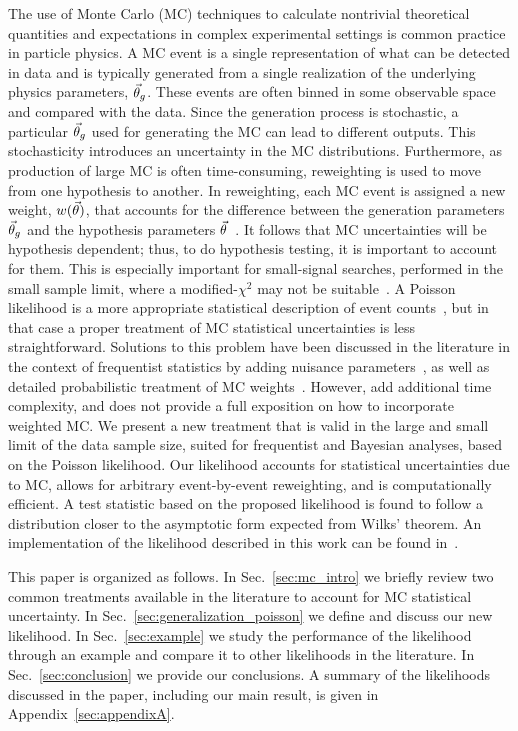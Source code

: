 The use of Monte Carlo (MC) techniques to calculate nontrivial theoretical quantities and expectations in complex experimental settings is common practice in particle physics.
A MC event is a single representation of what can be detected in data and is typically generated from a single realization of the underlying physics parameters, $\vec{\theta}_g$. These events are often binned in some observable space and compared with the data. Since the generation process is stochastic, a particular $\vec{\theta}_g$ used for generating the MC can lead to different outputs. This stochasticity introduces an uncertainty in the MC distributions. Furthermore, as production of large MC is often time-consuming, reweighting is used to move from one hypothesis to another. In reweighting, each MC event is assigned a new weight, $w(\vec{\theta})$, that accounts for the difference between the generation parameters $\vec{\theta}_g$ and the hypothesis parameters $\vec{\theta}$~\cite{Gainer:2014bta}. It follows that MC uncertainties will be hypothesis dependent; thus, to do hypothesis testing, it is important to account for them. This is especially important for small-signal searches, performed in the small sample limit, where a modified-$\chi^2$ may not be suitable~\cite{Lyons:1986em}. A Poisson likelihood is a more appropriate statistical description of event counts~\cite{poisson1837recherches}, but in that case a proper treatment of MC statistical uncertainties is less straightforward. Solutions to this problem have been discussed in the literature in the context of frequentist statistics by adding nuisance parameters~\cite{Barlow:1993dm,Cranmer:2012sba,Chirkin:2013lya}, as well as detailed probabilistic treatment of MC weights~\cite{Glusenkamp:2017rlp}. However, \cite{Barlow:1993dm, Chirkin:2013lya, Glusenkamp:2017rlp} add additional time complexity, and \cite{Cranmer:2012sba} does not provide a full exposition on how to incorporate weighted MC. We present a new treatment that is valid in the large and small limit of the data sample size, suited for frequentist and Bayesian analyses, based on the Poisson likelihood. Our likelihood accounts for statistical uncertainties due to MC, allows for arbitrary event-by-event reweighting, and is computationally efficient. A test statistic based on the proposed likelihood is found to follow a distribution closer to the asymptotic form expected from Wilks' theorem. An implementation of the likelihood described in this work can be found in~\cite{MCLLH}.

This paper is organized as follows. In Sec.~\ref{sec:mc_intro} we briefly review two common treatments available in the literature to account for MC statistical uncertainty. In Sec.~\ref{sec:generalization_poisson} we define and discuss our new likelihood. In Sec.~\ref{sec:example} we study the performance of the likelihood through an example and compare it to other likelihoods in the literature. In Sec.~\ref{sec:conclusion} we provide our conclusions. A summary of the likelihoods discussed in the paper, including our main result, is given in Appendix~\ref{sec:appendixA}.

